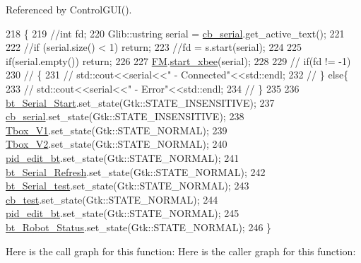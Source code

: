 Referenced by Control\+G\+U\+I().


\begin{DoxyCode}
218                                \{
219     \textcolor{comment}{//int fd;}
220     Glib::ustring serial = \hyperlink{class_control_g_u_i_a730f792c7de4d8c3cd4c933876d8bc52}{cb\_serial}.get\_active\_text();
221 
222     \textcolor{comment}{//if (serial.size() < 1) return;}
223     \textcolor{comment}{//fd = s.start(serial);}
224 
225     \textcolor{keywordflow}{if}(serial.empty()) \textcolor{keywordflow}{return};
226 
227     \hyperlink{class_control_g_u_i_a16612b604257a888faac7a1d7e9e3e51}{FM}.\hyperlink{class_flying_messenger_ae0513090a7933976d04ce67f4d90b1f3}{start\_xbee}(serial);
228 
229     \textcolor{comment}{//  if(fd != -1)}
230     \textcolor{comment}{// \{}
231     \textcolor{comment}{//        std::cout<<serial<<" - Connected"<<std::endl;}
232     \textcolor{comment}{// \} else\{}
233     \textcolor{comment}{//     std::cout<<serial<<" - Error"<<std::endl;}
234     \textcolor{comment}{// \}}
235 
236     \hyperlink{class_control_g_u_i_ae4c22e835b13a173a02ef4514b28c7f1}{bt\_Serial\_Start}.set\_state(Gtk::STATE\_INSENSITIVE);
237     \hyperlink{class_control_g_u_i_a730f792c7de4d8c3cd4c933876d8bc52}{cb\_serial}.set\_state(Gtk::STATE\_INSENSITIVE);
238     \hyperlink{class_control_g_u_i_a8c9b9a41a7ac7de9a7c1c323f70e43b4}{Tbox\_V1}.set\_state(Gtk::STATE\_NORMAL);
239     \hyperlink{class_control_g_u_i_ad4ec00b7d15236b0b8e6723e115c190a}{Tbox\_V2}.set\_state(Gtk::STATE\_NORMAL);
240     \hyperlink{class_control_g_u_i_a25b5eb5bf471a963e86624d3fa2c39a7}{pid\_edit\_bt}.set\_state(Gtk::STATE\_NORMAL);
241     \hyperlink{class_control_g_u_i_a391e47311e2e097bf551726b1df5d794}{bt\_Serial\_Refresh}.set\_state(Gtk::STATE\_NORMAL);
242     \hyperlink{class_control_g_u_i_a877559405ad1764d83748016a0f09d94}{bt\_Serial\_test}.set\_state(Gtk::STATE\_NORMAL);
243     \hyperlink{class_control_g_u_i_a93ab5972cf38d2cf8431cb375abc56e6}{cb\_test}.set\_state(Gtk::STATE\_NORMAL);
244     \hyperlink{class_control_g_u_i_a25b5eb5bf471a963e86624d3fa2c39a7}{pid\_edit\_bt}.set\_state(Gtk::STATE\_NORMAL);
245     \hyperlink{class_control_g_u_i_aa41e46c34d55d0d4c7b53ed2fa14deb8}{bt\_Robot\_Status}.set\_state(Gtk::STATE\_NORMAL);
246 \}
\end{DoxyCode}
Here is the call graph for this function\+:
Here is the caller graph for this function\+:
\mbox{\label{class_control_g_u_i_ac1c2a324c056d78dae8e2a0123855dc1}} 
